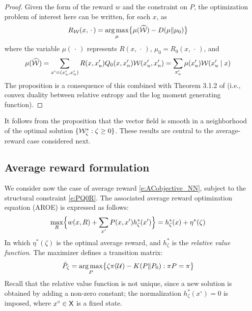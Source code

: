 \documentclass[final,12pt]{colt2018} %
\def\util{{\mathcal{U}}}
\def\reward{w}
\def\xz{x^\circ}
\def\argmax{\mathop{\rm arg\, max}}
\def\state{{\sf X}}
\def\cP{{\check{P}}}
\def\haclW{\widehat{\cal W}}
\def\clW{{\cal W}}
\def\varble{\,\cdot\,}
\begin{document}
\begin{proof}
 Given the form of the reward $\reward$ and the constraint on $P$, 
the optimization problem of interest here can be written, for each $x$, as
 \[
R_\clW (x,\varble) = \argmax_\mu  \bigl\{   \mu(\haclW  ) - D(\mu\| \mu_0)  \bigr\}
\]
where the variable $\mu(\varble) $ represents $R(x,\varble)$,   $\mu_0=R_0(x,\varble)$, and
\[
\mu(\haclW  ) =  \sum_{x' = (x'_u,x'_n)} R(x,x'_u)Q_0(x,x'_n) \clW(x'_u,x'_n) = \sum_{x'_u} \mu(x'_u) \clW(x'_u\mid  x) 
\]
The proposition is a consequence of this combined with   Theorem 3.1.2  of  \cite{demzei98a}  (i.e., convex duality between relative entropy and the log moment generating function).
\end{proof}
 

It follows from the proposition that the vector field is smooth in a neighborhood of the optimal solution $\{\clW^*_\zeta : \zeta\ge 0\}$.   These results are central to the average-reward case considered next.  

 
\subsection{Average reward formulation}
\label{s:AROE}

We consider now the case of average reward \eqref{e:ACobjective_NN}, subject to the structural constraint \eqref{e:PQ0R}.    The associated average reward optimization equation (AROE) is expressed as follows: 
\begin{equation}
\max_R\Bigl\{
\reward(x,R)
+\sum_{x'} P(x,x') h^*_\zeta(x') \Bigr\} = h^*_\zeta(x) + \eta^*(\zeta)
\label{e:AROE}
\end{equation}
 In which   $\eta^*(\zeta)$ is the optimal average reward, and $h^*_\zeta$ is the \textit{relative value function}.  The maximizer defines a transition matrix:
\begin{equation}
\cP_\zeta =\argmax_P \bigl \{\zeta \pi(\util) -  K(P\| P_0)  : \pi   P  = \pi  \bigr\}
\label{e:ARobjective}
\end{equation}
Recall that the relative value function is not unique, since  a new solution is obtained by adding a non-zero constant;  the normalization  $h^*_\zeta(\xz)=0$ is imposed, where $\xz\in\state$ is a fixed state.
\end{document}
